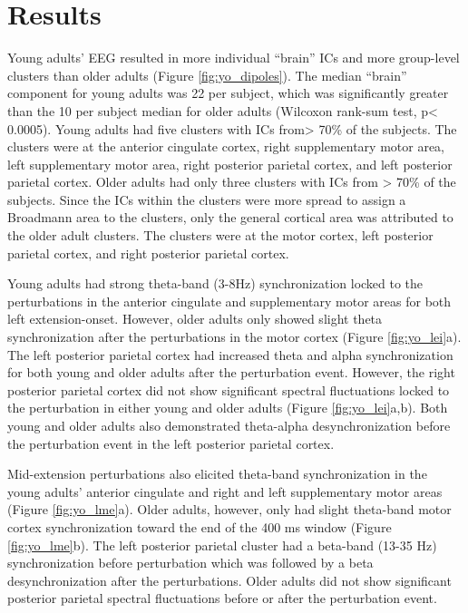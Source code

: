 \documentclass[../thesis_seyed.tex]{subfiles}
\begin{document}
\section{Results}
Young adults’ EEG resulted in more individual “brain” ICs and more group-level clusters than older adults (Figure \ref{fig:yo_dipoles}). The median “brain” component for young adults was 22 per subject, which was significantly greater than the 10 per subject median for older adults (Wilcoxon rank-sum test, p< 0.0005). Young adults had five clusters with ICs from> 70\% of the subjects. The clusters were at the anterior cingulate cortex, right supplementary motor area, left supplementary motor area, right posterior parietal cortex, and left posterior parietal cortex. Older adults had only three clusters with ICs from > 70\% of the subjects. Since the ICs within the clusters were more spread to assign a Broadmann area to the clusters, only the general cortical area was attributed to the older adult clusters. The clusters were at the motor cortex, left posterior parietal cortex, and right posterior parietal cortex.

Young adults had strong theta-band (3-8Hz) synchronization locked to the perturbations in the anterior cingulate and supplementary motor areas for both left extension-onset. However, older adults only showed slight theta synchronization after the perturbations in the motor cortex (Figure \ref{fig:yo_lei}a). The left posterior parietal cortex had increased theta and alpha synchronization for both young and older adults after the perturbation event. However, the right posterior parietal cortex did not show significant spectral fluctuations locked to the perturbation in either young and older adults (Figure \ref{fig:yo_lei}a,b). Both young and older adults also demonstrated theta-alpha desynchronization before the perturbation event in the left posterior parietal cortex.

Mid-extension perturbations also elicited theta-band synchronization in the young adults’ anterior cingulate and right and left supplementary motor areas (Figure \ref{fig:yo_lme}a). Older adults, however, only had slight theta-band motor cortex synchronization toward the end of the 400 ms window (Figure \ref{fig:yo_lme}b). The left posterior parietal cluster had a beta-band (13-35 Hz) synchronization before perturbation which was followed by a beta desynchronization after the perturbations. Older adults did not show significant posterior parietal spectral fluctuations before or after the perturbation event.
\end{document}
